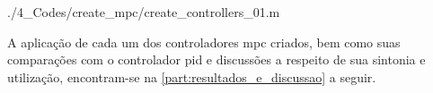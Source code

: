 
	{./4_Codes/create_mpc/create_controllers_01.m}
	\begin{center}
	\end{center}

A aplicação de cada um dos controladores \acrshort{mpc} criados, bem como suas comparações com o controlador
\acrshort{pid} e discussões a respeito de sua sintonia e utilização, encontram-se na \cref{part:resultados_e_discussao}
a seguir.